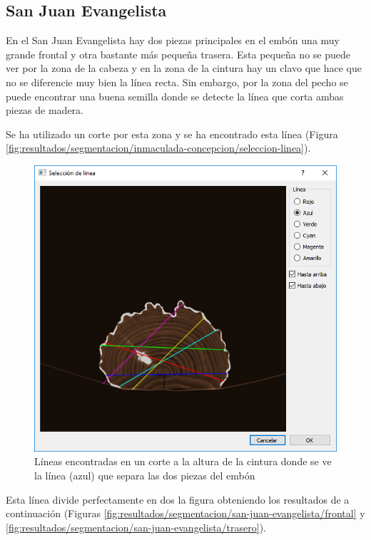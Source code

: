 \subsection{San Juan Evangelista}

En el San Juan Evangelista hay dos piezas principales en el embón una muy grande frontal y otra bastante más pequeña trasera. Esta pequeña no se puede ver por la zona de la cabeza y en la zona de la cintura hay un clavo que hace que no se diferencie muy bien la línea recta. Sin embargo, por la zona del pecho se puede encontrar una buena semilla donde se detecte la línea que corta ambas piezas de madera.

Se ha utilizado un corte por esta zona y se ha encontrado esta línea (Figura \ref{fig:resultados/segmentacion/inmaculada-concepcion/seleccion-linea}).

\begin{figure}[H]
	\centering
	\includegraphics[width=12cm]{imagenes/resultados/segmentacion/san-juan-evangelista/seleccion-linea}
	\caption{Líneas encontradas en un corte a la altura de la cintura donde se ve la línea (azul) que separa las dos piezas del embón}
	\label{fig:resultados/segmentacion/san-juan-evangelista/seleccion-linea}
\end{figure}

Esta línea divide perfectamente en dos la figura obteniendo los resultados de a continuación (Figuras \ref{fig:resultados/segmentacion/san-juan-evangelista/frontal} y \ref{fig:resultados/segmentacion/san-juan-evangelista/trasero}).

